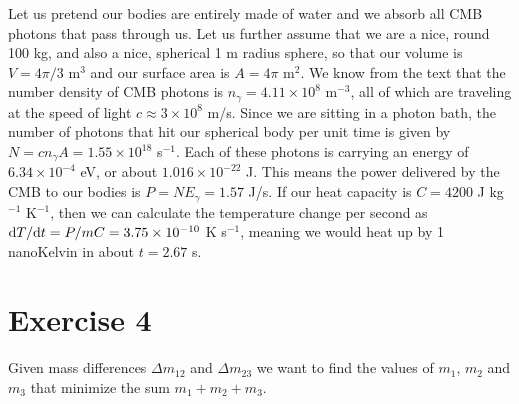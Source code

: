 \documentclass[12pt,a4paper]{article}
\newcommand\TM[1]{\todo[color=green!40, inline, size=\small]{TM: #1}}
\begin{document}
Let us pretend our bodies are entirely made of water and we absorb all CMB photons that pass through us. Let us further assume that we are a nice, round 100 kg, and also a nice, spherical 1 m radius sphere, so that our volume is $V=4\pi/3$ m$^{3}$ and our surface area is $A=4\pi$ m$^{2}$. We know from the text that the number density of CMB photons is $n_\gamma = 4.11\times 10^{8}$ m$^{-3}$, all of which are traveling at the speed of light $c\approx 3\times 10^8$ m/s. Since we are sitting in a photon bath, the number of photons that hit our spherical body per unit time is given by $N = cn_\gamma A = 1.55\times 10^{18}$ s$^{-1}$. Each of these photons is carrying an energy of $6.34\times10^{-4}$ eV, or about $1.016\times10^{-22}$ J. This means the power delivered by the CMB to our bodies is $P = NE_\gamma = 1.57$ J/s. If our heat capacity is $C = 4200$ J kg$^{-1}$ K$^{-1}$, then we can calculate the temperature change per second as ${\rm d}T/{\rm d}t = P/mC = 3.75\times 10^{-10}$ K s$^{-1}$, meaning we would heat up by 1 nanoKelvin in about $t= 2.67$ s.

\section{Exercise 4}
\label{sec:ex4}

Given mass differences $\Delta m_{12}$ and $\Delta m_{23}$ we want to find the values of $m_1$, $m_2$ and $m_3$ that minimize the sum $m_1+m_2+m_3$. \TM{Finish this.}
\end{document}
